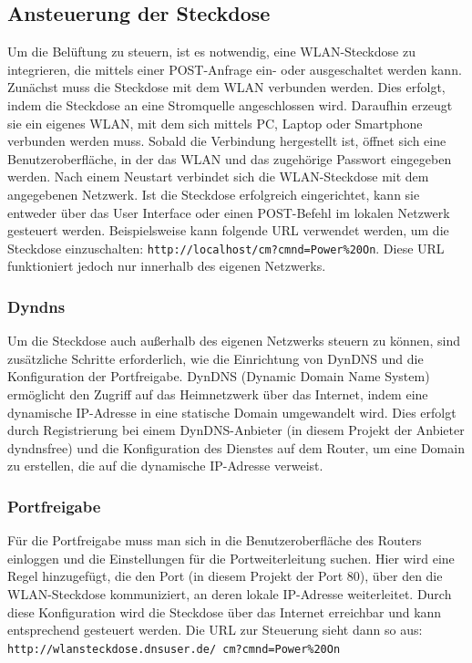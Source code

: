\documentclass[conference]{IEEEtran}
\begin{document}
\subsection{Ansteuerung der Steckdose}
Um die Belüftung zu steuern, ist es notwendig, eine WLAN-Steckdose zu integrieren, die mittels einer POST-Anfrage ein- oder ausgeschaltet werden kann. Zunächst muss die Steckdose mit dem WLAN verbunden werden. Dies erfolgt, indem die Steckdose an eine Stromquelle angeschlossen wird. Daraufhin erzeugt sie ein eigenes WLAN, mit dem sich mittels PC, Laptop oder Smartphone verbunden werden muss. Sobald die Verbindung hergestellt ist, öffnet sich eine Benutzeroberfläche, in der das WLAN und das zugehörige Passwort eingegeben werden. Nach einem Neustart verbindet sich die WLAN-Steckdose mit dem angegebenen Netzwerk.
Ist die Steckdose erfolgreich eingerichtet, kann sie entweder über das User Interface oder einen POST-Befehl im lokalen Netzwerk gesteuert werden. Beispielsweise kann folgende URL verwendet werden, um die Steckdose einzuschalten: \texttt{http://localhost/cm?cmnd=Power\%20On}. Diese URL funktioniert jedoch nur innerhalb des eigenen Netzwerks.

\subsubsection{Dyndns}
Um die Steckdose auch außerhalb des eigenen Netzwerks steuern zu können, sind zusätzliche Schritte erforderlich, wie die Einrichtung von DynDNS und die Konfiguration der Portfreigabe. DynDNS (Dynamic Domain Name System) ermöglicht den Zugriff auf das Heimnetzwerk über das Internet, indem eine dynamische IP-Adresse in eine statische Domain umgewandelt wird. Dies erfolgt durch Registrierung bei einem DynDNS-Anbieter (in diesem Projekt der Anbieter dyndnsfree) und die Konfiguration des Dienstes auf dem Router, um eine Domain zu erstellen, die auf die dynamische IP-Adresse verweist.
\subsubsection{Portfreigabe}
Für die Portfreigabe muss man sich in die Benutzeroberfläche des Routers einloggen und die Einstellungen für die Portweiterleitung suchen. Hier wird eine Regel hinzugefügt, die den Port (in diesem Projekt der Port 80), über den die WLAN-Steckdose kommuniziert, an deren lokale IP-Adresse weiterleitet. Durch diese Konfiguration wird die Steckdose über das Internet erreichbar und kann entsprechend gesteuert werden. Die URL zur Steuerung sieht dann so aus: \texttt{http://wlansteckdose.dnsuser.de/
cm?cmnd=Power\%20On}
\end{document}
